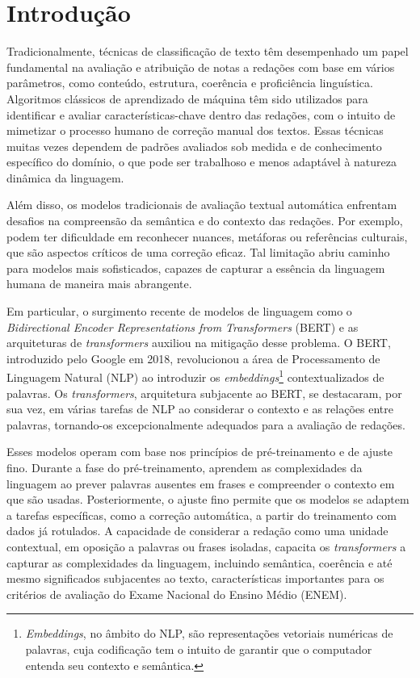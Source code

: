 \chapter{Introdução}

Tradicionalmente, técnicas de classificação de texto têm desempenhado um papel fundamental na avaliação e atribuição de notas a redações com base em vários parâmetros, como conteúdo, estrutura, coerência e proficiência linguística. Algoritmos clássicos de aprendizado de máquina têm sido utilizados para identificar e avaliar características-chave dentro das redações, com o intuito de mimetizar o processo humano de correção manual dos textos. Essas técnicas muitas vezes dependem de padrões avaliados sob medida e de conhecimento específico do domínio, o que pode ser trabalhoso e menos adaptável à natureza dinâmica da linguagem.

Além disso, os modelos tradicionais de avaliação textual automática enfrentam desafios na compreensão da semântica e do contexto das redações. Por exemplo, podem ter dificuldade em reconhecer nuances, metáforas ou referências culturais, que são aspectos críticos de uma correção eficaz. Tal limitação abriu caminho para modelos mais sofisticados, capazes de capturar a essência da linguagem humana de maneira mais abrangente.

Em particular, o surgimento recente de modelos de linguagem como o \textit{Bidirectional Encoder Representations from Transformers} (BERT) e as arquiteturas de \textit{transformers} auxiliou na mitigação desse problema. O BERT, introduzido pelo Google em 2018, revolucionou a área de Processamento de Linguagem Natural (NLP) ao introduzir os \textit{embeddings}\footnote{\textit{Embeddings}, no âmbito do NLP, são representações vetoriais numéricas de palavras, cuja codificação tem o intuito de garantir que o computador entenda seu contexto e semântica.} contextualizados de palavras. Os \textit{transformers}, arquitetura subjacente ao BERT, se destacaram, por sua vez, em várias tarefas de NLP ao considerar o contexto e as relações entre palavras, tornando-os excepcionalmente adequados para a avaliação de redações.

Esses modelos operam com base nos princípios de pré-treinamento e de ajuste fino. Durante a fase do pré-treinamento, aprendem as complexidades da linguagem ao prever palavras ausentes em frases e compreender o contexto em que são usadas. Posteriormente, o ajuste fino permite que os modelos se adaptem a tarefas específicas, como a correção automática, a partir do treinamento com dados já rotulados. A capacidade de considerar a redação como uma unidade contextual, em oposição a palavras ou frases isoladas, capacita os \textit{transformers} a capturar as complexidades da linguagem, incluindo semântica, coerência e até mesmo significados subjacentes ao texto, características importantes para os critérios de avaliação do Exame Nacional do Ensino Médio (ENEM).

